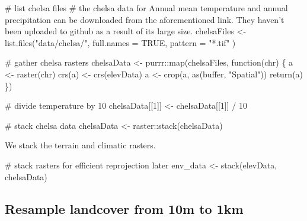 \documentclass[]{article}
\newenvironment{Shaded}{}{}
\newcommand{\CommentTok}[1]{\textcolor[rgb]{0.00,0.50,0.00}{#1}}
\newcommand{\ControlFlowTok}[1]{\textcolor[rgb]{0.00,0.00,1.00}{#1}}
\newcommand{\DataTypeTok}[1]{#1}
\newcommand{\DecValTok}[1]{#1}
\newcommand{\KeywordTok}[1]{\textcolor[rgb]{0.00,0.00,1.00}{#1}}
\newcommand{\NormalTok}[1]{#1}
\newcommand{\OperatorTok}[1]{#1}
\newcommand{\OtherTok}[1]{\textcolor[rgb]{1.00,0.25,0.00}{#1}}
\newcommand{\StringTok}[1]{\textcolor[rgb]{0.00,0.50,0.50}{#1}}
\begin{document}
\begin{Shaded}
\begin{Highlighting}[numbers=left,,]
\CommentTok{# list chelsa files}
\CommentTok{# the chelsa data for Annual mean temperature and annual precipitation can be downloaded from the aforementioned link. They haven't been uploaded to github as a result of its large size.}
\NormalTok{chelsaFiles <-}\StringTok{ }\KeywordTok{list.files}\NormalTok{(}\StringTok{"data/chelsa/"}\NormalTok{,}
  \DataTypeTok{full.names =} \OtherTok{TRUE}\NormalTok{,}
  \DataTypeTok{pattern =} \StringTok{"*.tif"}
\NormalTok{)}

\CommentTok{# gather chelsa rasters}
\NormalTok{chelsaData <-}\StringTok{ }\NormalTok{purrr}\OperatorTok{::}\KeywordTok{map}\NormalTok{(chelsaFiles, }\ControlFlowTok{function}\NormalTok{(chr) \{}
\NormalTok{  a <-}\StringTok{ }\KeywordTok{raster}\NormalTok{(chr)}
  \KeywordTok{crs}\NormalTok{(a) <-}\StringTok{ }\KeywordTok{crs}\NormalTok{(elevData)}
\NormalTok{  a <-}\StringTok{ }\KeywordTok{crop}\NormalTok{(a, }\KeywordTok{as}\NormalTok{(buffer, }\StringTok{"Spatial"}\NormalTok{))}
  \KeywordTok{return}\NormalTok{(a)}
\NormalTok{\})}

\CommentTok{# divide temperature by 10}
\NormalTok{chelsaData[[}\DecValTok{1}\NormalTok{]] <-}\StringTok{ }\NormalTok{chelsaData[[}\DecValTok{1}\NormalTok{]] }\OperatorTok{/}\StringTok{ }\DecValTok{10}

\CommentTok{# stack chelsa data}
\NormalTok{chelsaData <-}\StringTok{ }\NormalTok{raster}\OperatorTok{::}\KeywordTok{stack}\NormalTok{(chelsaData)}
\end{Highlighting}
\end{Shaded}

We stack the terrain and climatic rasters.

\begin{Shaded}
\begin{Highlighting}[numbers=left,,]
\CommentTok{# stack rasters for efficient reprojection later}
\NormalTok{env_data <-}\StringTok{ }\KeywordTok{stack}\NormalTok{(elevData, chelsaData)}
\end{Highlighting}
\end{Shaded}

\hypertarget{resample-landcover-from-10m-to-1km}{%
\subsection{Resample landcover from 10m to 1km}\label{resample-landcover-from-10m-to-1km}}
\end{document}

